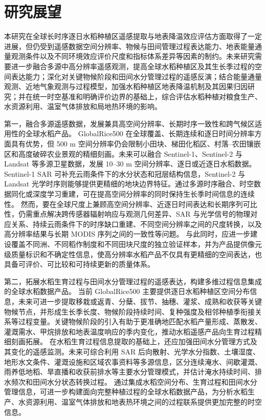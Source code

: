 \section{研究展望}

本研究在全球长时序逐日水稻种植区遥感提取与地表降温效应评估方面取得了一定进展，但仍受到遥感数据空间分辨率、物候与田间管理过程表达能力、地表能量通量观测条件以及不同环境效应评价尺度和指标体系差异等因素的制约。未来研究需要进一步融合多源中高分辨率遥感观测，提高全球水稻种植区及其生长季过程的空间表达能力；深化对关键物候阶段和田间水分管理过程的遥感反演；结合能量通量观测、近地气象观测与过程模型，加强水稻种植区地表降温机制及其因果归因研究；并在统一时空基准和明确评价边界的基础上，综合评估水稻种植对粮食生产、水资源利用、温室气体排放和局地热环境的影响。

第一，融合多源遥感数据，发展兼具高空间分辨率、长期时序一致性和跨气候区适用性的全球水稻产品。
GlobalRice500 在全球覆盖、长期连续和逐日时间分辨率方面具有优势，但 500 m 空间分辨率仍会限制小田块、梯田化稻区、村落--农田镶嵌区和高度破碎农业景观的精细刻画。未来可以融合 Sentinel-1、Sentinel-2 与 Landsat 等多源卫星数据，发展 10--30 m 空间分辨率、逐日或近逐日水稻数据。Sentinel-1 SAR 可补充云雨条件下的水分状态和冠层结构信息，Sentinel-2 与 Landsat 光学时序则能够提供更精细的地块边界特征。通过多源时序融合、时空数据同化或深度学习重建，可在提高空间分辨率的同时保持生长季时间信息的连续性。
然而，要在全球尺度上兼顾高空间分辨率、近逐日时间表达和长期序列可比性，仍需重点解决跨传感器辐射响应与观测几何差异、SAR 与光学信号的物理对应关系、持续云雨条件下的时序缺口重建、不同空间分辨率之间的尺度转换，以及高分辨率结果与长期 MODIS 序列之间的一致性等问题。
与此同时，应进一步建设覆盖不同洲、不同稻作制度和不同田块尺度的独立验证样本，并为产品提供像元级质量标识和不确定性信息，使高分辨率水稻产品不仅具有更精细的空间表达，也具备可评价、可比较和可持续更新的质量体系。

第二，拓展水稻生育过程与田间水分管理过程的遥感表达，构建多维过程信息集成的全球水稻数据产品。
当前 GlobalRice500 主要提供逐日水稻种植区空间分布信息，未来可进一步提取移栽或返青、分蘖、拔节、抽穗、灌浆、成熟和收获等关键物候节点，并形成生长季长度、物候阶段持续时间、复种强度及相邻种植季衔接关系等过程变量。关键物候阶段的引入有助于更准确地匹配水稻产量形成、蒸散发、灌溉需水、甲烷排放和地表温度响应的季内变化，推动水稻遥感产品向生育过程精细刻画拓展。
在水稻生育过程信息提取的基础上，还应加强田间水分管理方式及其变化的遥感监测。未来可综合利用 SAR 后向散射、光学水分指数、土壤湿度、地形水文条件、灌溉设施和区域农事资料等多源信息，区分连续淹水、间歇灌溉、雨养低地稻、旱直播和收获前排水等主要水分管理模式，并估计淹水持续时间、排水频次和田间水分状态转换过程。%
通过集成水稻空间分布、生育过程和田间水分管理信息，可进一步构建面向完整种植过程的全球水稻数据产品，为分析水稻生产、水资源利用、温室气体排放和地表热环境之间的过程联系提供更加完整的时空信息。


